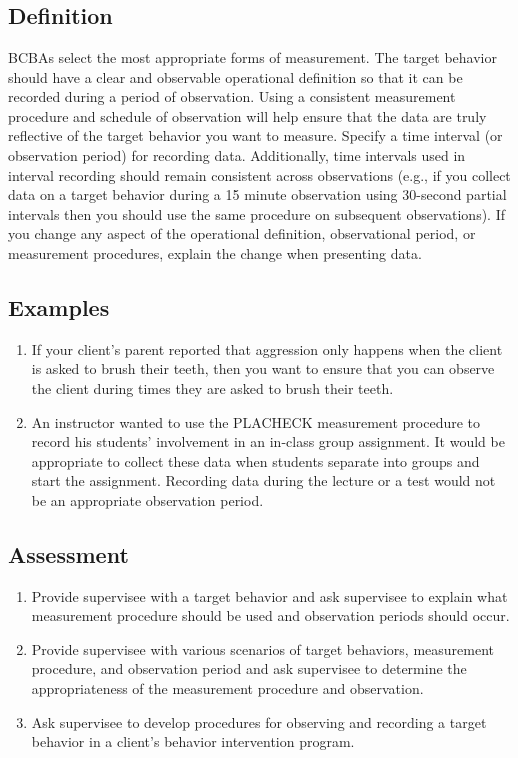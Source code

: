 \clearpage \section[\fourhTwo{}]{\fourhTwo{}%
              }
\subsection{Definition}
BCBAs select the most appropriate forms of measurement. The target behavior should have a clear and observable operational definition so that it can be recorded during a period of observation. Using a consistent measurement procedure and schedule of observation will help ensure that the data are truly reflective of the target behavior you want to measure. Specify a time interval (or observation period) for recording data. Additionally, time intervals used in interval recording should remain consistent across observations (e.g., if you collect data on a target behavior during a 15 minute observation using 30-second partial intervals then you should use the same procedure on subsequent observations).  If you change any aspect of the operational definition, observational period, or measurement procedures, explain the change when presenting data.
%
\subsection{Examples}
\begin{enumerate}
\item If your client's parent reported that aggression only happens when the client is asked to brush their teeth, then you want to ensure that you can observe the client during times they are asked to brush their teeth.
\item An instructor wanted to use the PLACHECK measurement procedure to record his students' involvement in an in-class group assignment.  It would be appropriate to collect these data when students separate into groups and start the assignment.  Recording data during the lecture or a test would not be an appropriate observation period.
%
\end{enumerate}
%
\subsection{Assessment}
\begin{enumerate}
\item Provide supervisee with a target behavior and ask supervisee to explain what measurement procedure should be used and observation periods should occur.
\item Provide supervisee with various scenarios of target behaviors, measurement procedure, and observation period and ask supervisee to determine the appropriateness of the measurement procedure and observation.
\item Ask supervisee to develop procedures for observing and recording a target behavior in a client's behavior intervention program.
%
\end{enumerate}
%
